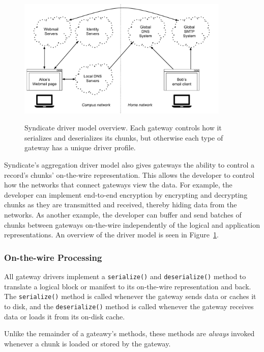 \begin{figure}[h]
   \caption{Syndicate driver model overview.  Each gateway controls how it
   serializes and deserializes its chunks, but otherwise each type of gateway has a
   unique driver profile.}
   \centering
   \includegraphics[width=0.9\textwidth,page=22]{figures/dissertation-figures}
   \label{fig:chap3-syndicate-driver-model}
\end{figure}

Syndicate's aggregation driver model also gives gateways the ability to
control a record's chunks' on-the-wire representation.  This allows the
developer to control how the networks that connect gateways view the data.  For
example, the developer can implement end-to-end encryption by encrypting and
decrypting chunks as they are transmitted and received, thereby hiding
data from the networks.  As another example, the developer can buffer and send
batches of chunks between gateways on-the-wire independently of the logical and
application representations.  An overview of the driver model is seen in
Figure~\ref{fig:chap3-syndicate-driver-model}.

\subsubsection{On-the-wire Processing}

All gateway drivers implement a \texttt{serialize()} and \texttt{deserialize()}
method to translate a logical block or manifest to its on-the-wire
representation and back.  The \texttt{serialize()} method is called whenever the gateway sends
data or caches it to disk, and the \texttt{deserialize()} method is called
whenever the gateway receives data or loads it from its on-disk cache.

Unlike the remainder of a gateawy's methods, these methods are \emph{always}
invoked whenever a chunk is loaded or stored by the gateway.

